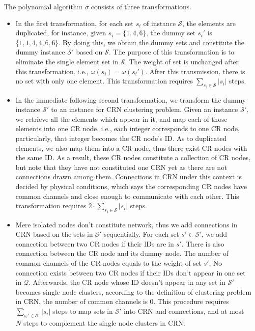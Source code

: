 \documentclass[journal,comsoc]{IEEEtran}
\makeatletter
\theoremstyle{mytheoremstyle}
\theoremstyle{mytheoremstyle}
\theoremstyle{mytheoremstyle}
\renewenvironment{proof}[1][\proofname]{%
      \par\pushQED{\qed}\fontfamily{ptm}\selectfont%
      \topsep6\p@\@plus6\p@\relax
      \trivlist\item[\hskip\labelsep\bfseries#1\@addpunct{.}]%
      \ignorespaces
    }{%
      \popQED\endtrivlist\@endpefalse
    }
\newcommand{\ie}{i.e., }
\makeatother
\begin{document}
\begin{proof}
The polynomial algorithm $\sigma$ consists of three transformations.
\begin{itemize}
\item In the first transformation, for each set $s_i$ of instance $\mathcal{S}$, the elements are duplicated, for instance, given $s_i=\{1, 4, 6\}$, the dummy set $s_i'$ is $\{1,1,4,4,6,6\}$.
By doing this, we obtain the dummy sets and constitute the dummy instance $\mathcal{S}'$ based on $\mathcal{S}$.
The purpose of this transformation is to eliminate the single element set in $\mathcal{S}$.
The weight of set is unchanged after this transformation, \ie $\omega(s_i)=\omega(s_i')$.
After this transmission, there is no set with only one element.
This transformation requires $\sum_{s_i \in \mathcal{S}} |s_i|$ steps.
\item In the immediate following second transformation, we transform the dummy instance $\mathcal{S}'$ to an instance for CRN clustering problem.
Given an instance $\mathcal{S}'$, we retrieve all the elements which appear in it, and map each of those elements into one CR node, \ie each integer corresponds to one CR node, particularly, that integer becomes the CR node's ID.
As to duplicated elements, we also map them into a CR node, thus there exist CR nodes with the same ID.
As a result, these CR nodes constitute a collection of CR nodes, but note that they have not constituted one CRN yet as there are not connections drawn among them.
Connections in CRN under this context is decided by physical conditions, which says the corresponding CR nodes have common channels and close enough to communicate with each other.
This transformation requires $2\cdot\sum_{s_i \in \mathcal{S}} |s_i|$ steps.
\item Mere isolated nodes don't constitute network, thus we add connections in CRN based on the sets in $\mathcal{S}'$ sequentially.
For each set $s'\in \mathcal{S}'$, we add connection between two CR nodes if their IDs are in $s'$.
There is also connection between the CR node and its dummy node.
The number of common channels of the CR nodes equals to the weight of set $s'$.
No connection exists between two CR nodes if their IDs don't appear in one set in $\mathcal{Q}$.
Afterwards, the CR node whose ID doesn't appear in any set in $\mathcal{S'}$ becomes single node clusters, according to the definition of clustering problem in CRN, the number of common channels is 0.
This procedure requires $\sum_{s_i' \in \mathcal{S}'} |s_i|$ steps to map sets in $\mathcal{S}'$ into CRN and connections, and at most $N$ steps to complement the single node clusters in CRN.


\end{itemize}
\end{proof}
\end{document}
